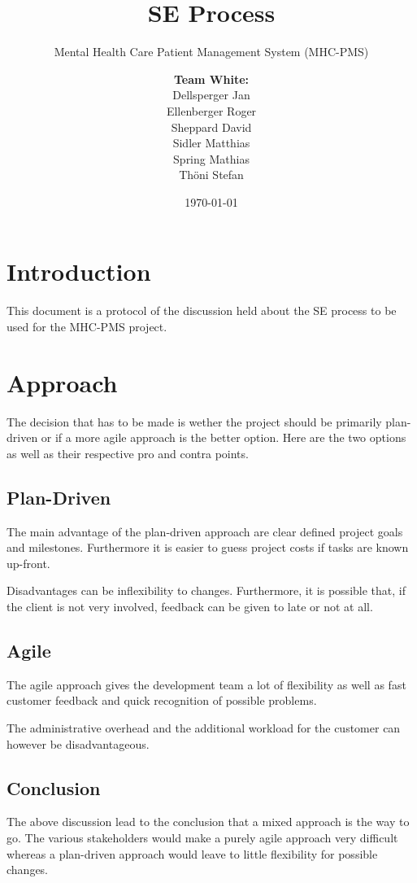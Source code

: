 \documentclass[a4paper]{scrartcl}
\title{SE Process}
\subtitle{Mental Health Care Patient Management System (MHC-PMS)}
\author{
\begin{tabular}{l}
\normalfont\bfseries{Team White:}\\
Dellsperger Jan\\
Ellenberger Roger\\
Sheppard David\\
Sidler Matthias\\
Spring Mathias\\
Thöni Stefan
\end{tabular}
}
\date{\today}
\begin{document}
\begin{titlepage}
	\maketitle
\end{titlepage}

\section{Introduction}
This document is a protocol of the discussion held about the SE process to be used for the MHC-PMS project.

\section{Approach}
The decision that has to be made is wether the project should be primarily plan-driven or if a more agile approach is the better option. Here are the two options as well as their respective pro and contra points.

\subsection{Plan-Driven}
The main advantage of the plan-driven approach are clear defined project goals and milestones. Furthermore it is easier to guess project costs if tasks are known up-front.

Disadvantages can be inflexibility to changes. Furthermore, it is possible that, if the client is not very involved, feedback can be given to late or not at all.

\subsection{Agile}
The agile approach gives the development team a lot of flexibility as well as fast customer feedback and quick recognition of possible problems.

The administrative overhead and the additional workload for the customer can however be disadvantageous.

\subsection{Conclusion}
The above discussion lead to the conclusion that a mixed approach is the way to go. The various stakeholders would make a purely agile approach very difficult whereas a plan-driven approach would leave to little flexibility for possible changes.
\end{document}
